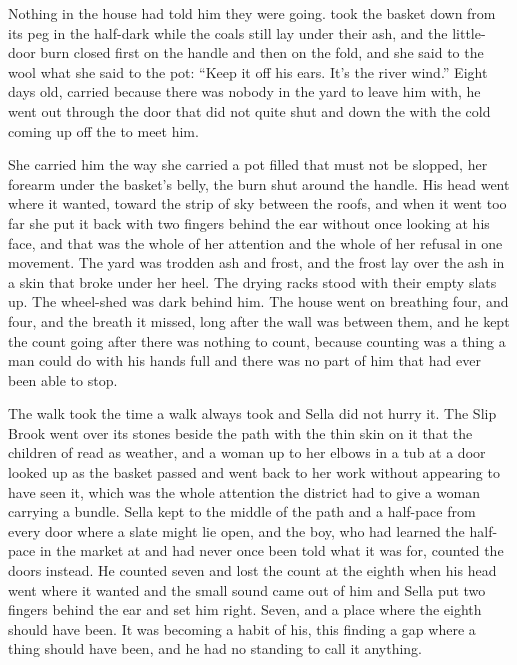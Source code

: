 
Nothing in the house had told him they were going.  took the basket down from its peg in the half-dark while the coals still lay under their ash, and the little-door burn closed first on the handle and then on the fold, and she said to the wool what she said to the pot: “Keep it off his ears. It's the river wind.” Eight days old, carried because there was nobody in the yard to leave him with, he went out through the door that did not quite shut and down the  with the cold coming up off the  to meet him.

She carried him the way she carried a pot filled that must not be slopped, her forearm under the basket's belly, the burn shut around the handle. His head went where it wanted, toward the strip of sky between the roofs, and when it went too far she put it back with two fingers behind the ear without once looking at his face, and that was the whole of her attention and the whole of her refusal in one movement. The yard was trodden ash and frost, and the frost lay over the ash in a skin that broke under her heel. The drying racks stood with their empty slats up. The wheel-shed was dark behind him. The house went on breathing four, and four, and the breath it missed, long after the wall was between them, and he kept the count going after there was nothing to count, because counting was a thing a man could do with his hands full and there was no part of him that had ever been able to stop.

The walk took the time a walk always took and Sella did not hurry it. The Slip Brook went over its stones beside the path with the thin skin on it that the children of  read as weather, and a woman up to her elbows in a tub at a door looked up as the basket passed and went back to her work without appearing to have seen it, which was the whole attention the district had to give a woman carrying a bundle. Sella kept to the middle of the path and a half-pace from every door where a slate might lie open, and the boy, who had learned the half-pace in the market at  and had never once been told what it was for, counted the doors instead. He counted seven and lost the count at the eighth when his head went where it wanted and the small sound came out of him and Sella put two fingers behind the ear and set him right. Seven, and a place where the eighth should have been. It was becoming a habit of his, this finding a gap where a thing should have been, and he had no standing to call it anything.

